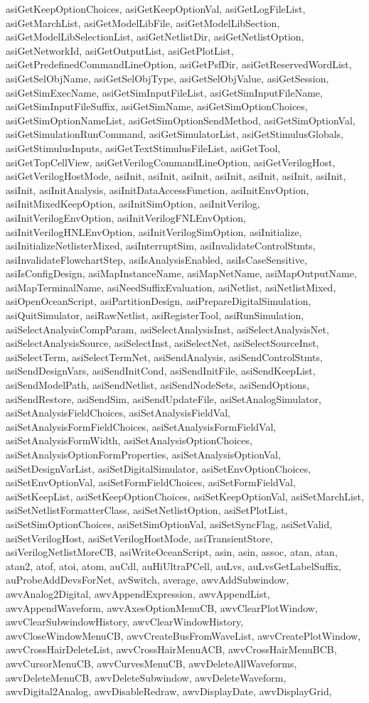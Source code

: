{{asiGetKeepOptionChoices, asiGetKeepOptionVal, asiGetLogFileList, asiGetMarchList, asiGetModelLibFile, asiGetModelLibSection, asiGetModelLibSelectionList, asiGetNetlistDir, asiGetNetlistOption, asiGetNetworkId, asiGetOutputList, asiGetPlotList, asiGetPredefinedCommandLineOption, asiGetPsfDir, asiGetReservedWordList, asiGetSelObjName, asiGetSelObjType, asiGetSelObjValue, asiGetSession, asiGetSimExecName, asiGetSimInputFileList, asiGetSimInputFileName, asiGetSimInputFileSuffix, asiGetSimName, asiGetSimOptionChoices, asiGetSimOptionNameList, asiGetSimOptionSendMethod, asiGetSimOptionVal, asiGetSimulationRunCommand, asiGetSimulatorList, asiGetStimulusGlobals, asiGetStimulusInputs, asiGetTextStimulusFileList, asiGetTool, asiGetTopCellView, asiGetVerilogCommandLineOption, asiGetVerilogHost, asiGetVerilogHostMode, asiInit, asiInit, asiInit, asiInit, asiInit, asiInit, asiInit, asiInit, asiInitAnalysis, asiInitDataAccessFunction, asiInitEnvOption, asiInitMixedKeepOption, asiInitSimOption, asiInitVerilog, asiInitVerilogEnvOption, asiInitVerilogFNLEnvOption, asiInitVerilogHNLEnvOption, asiInitVerilogSimOption, asiInitialize, asiInitializeNetlisterMixed, asiInterruptSim, asiInvalidateControlStmts, asiInvalidateFlowchartStep, asiIsAnalysisEnabled, asiIsCaseSensitive, asiIsConfigDesign, asiMapInstanceName, asiMapNetName, asiMapOutputName, asiMapTerminalName, asiNeedSuffixEvaluation, asiNetlist, asiNetlistMixed, asiOpenOceanScript, asiPartitionDesign, asiPrepareDigitalSimulation, asiQuitSimulator, asiRawNetlist, asiRegisterTool, asiRunSimulation, asiSelectAnalysisCompParam, asiSelectAnalysisInst, asiSelectAnalysisNet, asiSelectAnalysisSource, asiSelectInst, asiSelectNet, asiSelectSourceInst, asiSelectTerm, asiSelectTermNet, asiSendAnalysis, asiSendControlStmts, asiSendDesignVars, asiSendInitCond, asiSendInitFile, asiSendKeepList, asiSendModelPath, asiSendNetlist, asiSendNodeSets, asiSendOptions, asiSendRestore, asiSendSim, asiSendUpdateFile, asiSetAnalogSimulator, asiSetAnalysisFieldChoices, asiSetAnalysisFieldVal, asiSetAnalysisFormFieldChoices, asiSetAnalysisFormFieldVal, asiSetAnalysisFormWidth, asiSetAnalysisOptionChoices, asiSetAnalysisOptionFormProperties, asiSetAnalysisOptionVal, asiSetDesignVarList, asiSetDigitalSimulator, asiSetEnvOptionChoices, asiSetEnvOptionVal, asiSetFormFieldChoices, asiSetFormFieldVal, asiSetKeepList, asiSetKeepOptionChoices, asiSetKeepOptionVal, asiSetMarchList, asiSetNetlistFormatterClass, asiSetNetlistOption, asiSetPlotList, asiSetSimOptionChoices, asiSetSimOptionVal, asiSetSyncFlag, asiSetValid, asiSetVerilogHost, asiSetVerilogHostMode, asiTransientStore, asiVerilogNetlistMoreCB, asiWriteOceanScript, asin, asin, assoc, atan, atan, atan2, atof, atoi, atom, auCdl, auHiUltraPCell, auLvs, auLvsGetLabelSuffix, auProbeAddDevsForNet, avSwitch, average, awvAddSubwindow, awvAnalog2Digital, awvAppendExpression, awvAppendList, awvAppendWaveform, awvAxesOptionMenuCB, awvClearPlotWindow, awvClearSubwindowHistory, awvClearWindowHistory, awvCloseWindowMenuCB, awvCreateBusFromWaveList, awvCreatePlotWindow, awvCrossHairDeleteList, awvCrossHairMenuACB, awvCrossHairMenuBCB, awvCursorMenuCB, awvCurvesMenuCB, awvDeleteAllWaveforms, awvDeleteMenuCB, awvDeleteSubwindow, awvDeleteWaveform, awvDigital2Analog, awvDisableRedraw, awvDisplayDate, awvDisplayGrid, }}
